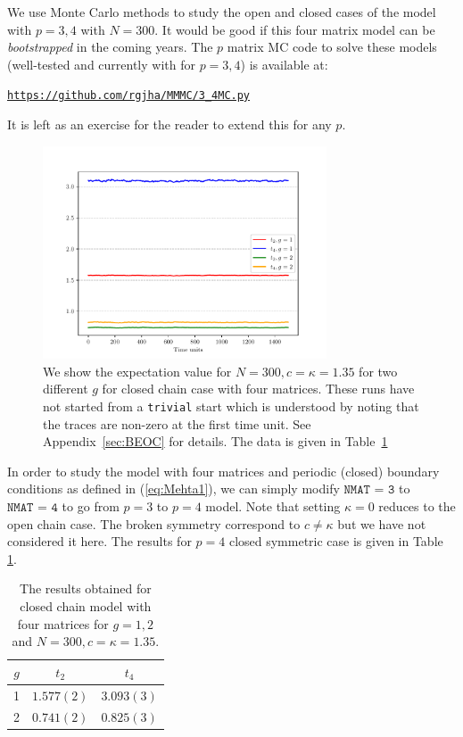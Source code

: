 \documentclass[letter,11pt]{article}
\begin{document}
We use Monte Carlo methods to study the open and closed cases of the model with $p = 3,4$ with $N = 300$. It would be good if this four matrix model can be \textit{bootstrapped} in the coming years. The $p$ matrix MC code to solve these models (well-tested and currently with for $p = 3,4$) is available at: 
\begin{center} \texttt{\href{https://github.com/rgjha/MMMC/blob/main/3_4MMC.py}{https://github.com/rgjha/MMMC/3\_4MC.py}} \end{center}
It is left as an exercise for the reader to extend this for any $p$. 
\begin{figure}[htbp] 
	\centering 
	\includegraphics[width=0.75\textwidth]{figs/4MM_g1_g2.pdf}
	\caption{\label{fig:4MM_closed1} We show the expectation value for $N=300, c=\kappa=1.35$ for two different $g$ for closed chain case with four matrices. These runs have not started from a \texttt{trivial} start
		which is understood by noting that the traces are non-zero at the first time unit. See Appendix~\ref{sec:BEOC} for details. The data is given in Table~\ref{table:4mchain_data}}
\end{figure}
In order to study the model with four matrices and periodic (closed) boundary conditions 
as defined in (\ref{eq:Mehta1}), we can simply modify $\texttt{NMAT = 3}$ to  $\texttt{NMAT = 4}$ to go from $p=3$ to $p=4$ model.  Note that setting $\kappa=0$ reduces to the open chain case. The broken symmetry correspond to $ c \neq \kappa$ but we have not considered it here. The results for $p=4$ closed symmetric case is given in Table \ref{table:4mchain_data}. 
\begin{table}[h!]
	\centering
	\begin{tabular}{||c c c||} 
		\hline
		$g$ & $ t_2 $ & $t_4 $ \\ [0.5ex] 
		\hline\hline
		1 & $ 1.577(2) $ & $3.093(3)$ \\
		2 & $ 0.741(2)$ & $0.825(3) $  
		\\ [1ex] 
		\hline 
	\end{tabular}
	\caption{The results obtained for closed chain model with four matrices for $g=1,2$ and $N=300, c=\kappa=1.35$.}
	\label{table:4mchain_data}
\end{table}
\end{document}
